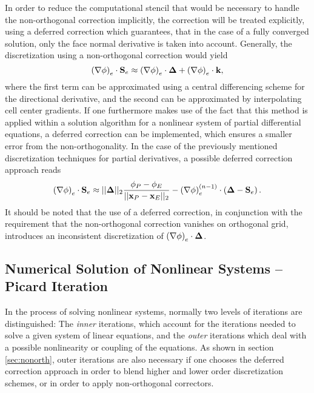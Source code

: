 In order to reduce the computational stencil that would be necessary to handle the non-orthogonal correction implicitly, the correction will be treated explicitly, using a deferred correction which guarantees, that in the case of a fully converged solution, only the face normal derivative is taken into account. Generally, the discretization using a non-orthogonal correction would yield 
\begin{displaymath}
  \left( \nabla \phi \right)_e \cdot \mathbf{S}_e \approx \left(\nabla \phi \right)_e \cdot \boldsymbol{\Delta} + \left( \nabla \phi \right)_e \cdot \mathbf{k},
\end{displaymath}
where the first term can be approximated using a central differencing scheme for the directional derivative, and the second can be approximated by interpolating cell center gradients. If one furthermore makes use of the fact that this method is applied within a solution algorithm for a nonlinear system of partial differential equations, a deferred correction can be implemented, which ensures a smaller error from the non-orthogonality. In the case of the previously mentioned discretization techniques for partial derivatives, a possible deferred correction approach reads
\begin{displaymath}
  \left( \nabla \phi \right)_e \cdot \mathbf{S}_e \approx ||\boldsymbol{\Delta}||_2 \frac{\phi_P - \phi_E}{||\mathbf{x}_P - \mathbf{x}_E||_2} - \left(\nabla \phi \right)_e^{(n-1)} \cdot \left(\boldsymbol{\Delta} - \mathbf{S}_e \right).
\end{displaymath}
It should be noted that the use of a deferred correction, in conjunction with the requirement that the non-orthogonal correction vanishes on orthogonal grid, introduces an inconsistent discretization of \( \left(\nabla \phi \right)_e \cdot \boldsymbol{\Delta} \).

\subsection{Numerical Solution of Nonlinear Systems -- Picard Iteration}
\label{sec:nonlinear}

In the process of solving nonlinear systems, normally two levels of iterations are distinguished: The \emph{inner} iterations, which account for the iterations needed to solve a given system of linear equations, and the \emph{outer} iterations which deal with a possible nonlinearity or coupling of the equations. As shown in section \ref{sec:nonorth}, outer iterations are also necessary if one chooses the deferred correction approach in order to blend higher and lower order discretization schemes, or in order to apply non-orthogonal correctors.

